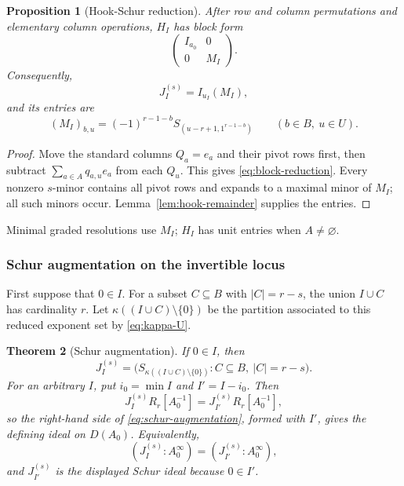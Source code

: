 \documentclass[10pt,fleqn]{article}
\numberwithin{equation}{section}
\newtheorem{theorem}{Theorem}[section]
\newtheorem{proposition}[theorem]{Proposition}
\begin{document}
\begin{proposition}[Hook-Schur reduction]\label{prop:hook-reduction}
After row and column permutations and elementary column operations, $H_I$ has block form
\begin{equation}\label{eq:block-reduction}
 \begin{pmatrix}I_{a_0}&0\\0&M_I\end{pmatrix}.
\end{equation}
Consequently,
\begin{equation}\label{eq:ideal-reduction}
 J_I^{(s)}=I_{u_I}(M_I),
\end{equation}
and its entries are
\[
 (M_I)_{b,u}=(-1)^{r-1-b}S_{(u-r+1,1^{r-1-b})}
 \qquad(b\in B,\ u\in U).
\]
\end{proposition}

\begin{proof}
Move the standard columns $Q_a=e_a$ and their pivot rows first, then
subtract $\sum_{a\in A}q_{a,u}e_a$ from each $Q_u$.  This gives
\eqref{eq:block-reduction}.  Every nonzero $s$-minor contains all pivot
rows and expands to a maximal minor of $M_I$; all such minors occur.
Lemma~\ref{lem:hook-remainder} supplies the entries.
\end{proof}

Minimal graded resolutions use $M_I$; $H_I$ has unit entries when
$A\ne\varnothing$.

\subsubsection{Schur augmentation on the invertible locus}

First suppose that $0\in I$.  For a subset $C\subseteq B$ with $|C|=r-s$, the union
$I\cup C$ has cardinality $r$.  Let $\kappa((I\cup C)\setminus\{0\})$ be the partition associated to this
reduced exponent set by \eqref{eq:kappa-U}.

\begin{theorem}[Schur augmentation]\label{thm:schur-augmentation}
If $0\in I$, then
\begin{equation}\label{eq:schur-augmentation}
 J_I^{(s)}=
 \bigl(S_{\kappa((I\cup C)\setminus\{0\})}:
 C\subseteq B,\ |C|=r-s\bigr).
\end{equation}
For an arbitrary $I$, put $i_0=\min I$ and $I'=I-i_0$.  Then
\begin{equation}\label{eq:schur-localization}
 J_I^{(s)}R_r[A_0^{-1}]
 =J_{I'}^{(s)}R_r[A_0^{-1}],
\end{equation}
so the right-hand side of \eqref{eq:schur-augmentation}, formed with $I'$, gives the defining
ideal on $D(A_0)$.  Equivalently,
\begin{equation}\label{eq:schur-saturation}
 (J_I^{(s)}:A_0^\infty)=(J_{I'}^{(s)}:A_0^\infty),
\end{equation}
and $J_{I'}^{(s)}$ is the displayed Schur ideal because $0\in I'$.
\end{theorem}
\end{document}
